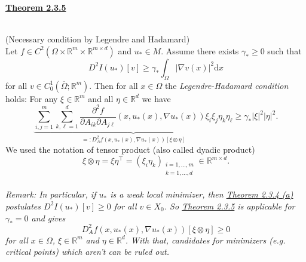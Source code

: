 \hypertarget{theorem_2_3_5}{\textbf{\underline{Theorem 2.3.5}}}\\
(Necessary condition by Legendre and Hadamard)\\
Let $f\in C^2(\Omega\times\mathbb{R}^m\times\mathbb{R}^{m\times d})$ and $u_*\in M$. Assume there exists $\gamma_*\geq0$ such that
\[D^2I(u_*)[v]\geq\gamma_*\int_\Omega{\lvert\nabla v(x)\rvert^2\mathrm{d}x}\]
for all $v\in C_0^1(\overline{\Omega};\mathbb{R}^m)$. Then for all $x\in\Omega$ the \textit{Legendre-Hadamard condition} holds: For any $\xi\in\mathbb{R}^m$ and all $\eta\in\mathbb{R}^d$ we have
\[\underbrace{\sum_{i,j=1}^m{\sum_{k,\ell=1}^d{\frac{\partial^2f}{\partial A_{ik}\partial A_{j\ell}}(x,u_*(x),\nabla u_*(x))\xi_i\xi_j\eta_k\eta_\ell}}}_{=:D_A^2f(x,u_*(x),\nabla u_*(x))[\xi\otimes\eta]}\geq\gamma_*\lvert\xi\rvert^2\lvert\eta\rvert^2.\]
We used the notation of tensor product (also called dyadic product)
\[\xi\otimes\eta=\xi\eta^\top=(\xi_i\eta_k)_{\substack{i=1,\dotsc,m\\k=1,\dotsc,d}}\in\mathbb{R}^{m\times d}.\]\\

\textit{Remark: In particular, if $u_*$ is a weak local minimizer, then \hyperlink{theorem_2_3_4}{Theorem 2.3.4 (a)} postulates $D^2I(u_*)[v]\geq0$ for all $v\in X_0$. So \hyperlink{theorem_2_3_5}{Theorem 2.3.5} is applicable for $\gamma_*=0$ and gives
\[D_A^2f(x,u_*(x),\nabla u_*(x))[\xi\otimes\eta]\geq0\]
for all $x\in\Omega$, $\xi\in\mathbb{R}^m$ and $\eta\in\mathbb{R}^d$. With that, candidates for minimizers (e.g. critical points) which aren't can be ruled out.}\\

